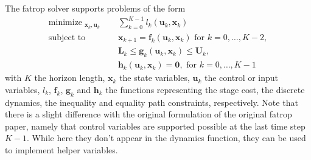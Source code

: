 \documentclass[12pt]{article}
\DeclareMathOperator*{\minimize}{minimize}
\begin{document}
The fatrop solver supports problems of the form
\begin{subequations} \label{software:eq:COCP} 
        \begin{align}
                \minimize_{\substack{\mathbf{x}_k, \mathbf{u}_k}} \quad &  \sum_{k=0}^{K-1} l_k(\mathbf{u}_k, \mathbf{x}_k)          \\
                \text{subject to} \quad
                                                                                     & \mathbf{x}_{k+1} = \mathbf{f}_k(\mathbf{u}_k, \mathbf{x}_k) \text{ for }  k = 0, \dots, K-2 , \label{ch:software:eq:ocpdyn}    \\
                                                                                     & \mathbf{L}_k \leq \mathbf{g}_k(\mathbf{u}_k, \mathbf{x}_k) \leq \mathbf{U}_k, \\
                                                                                    & \mathbf{h}_k(\mathbf{u}_k, \mathbf{x}_k) =\mathbf{0}, \text{ for }  k = 0, \dots, K-1                        
        \end{align}
\end{subequations}
with $K$ the horizon length, $\mathbf{x}_k$ the state variables, $\mathbf{u}_k$ the control or input variables, $l_k$, $\mathbf{f}_k$, $\mathbf{g}_k$ and $\mathbf{h}_k$ the functions representing the stage cost, the discrete dynamics, the inequality and equality path constraints, respectively.
Note that there is a slight difference with the original formulation of the original fatrop paper, namely that control variables are supported possible at the last time step $K-1$.
While here they don't appear in the dynamics function, they can be used to implement helper variables.
\end{document}
